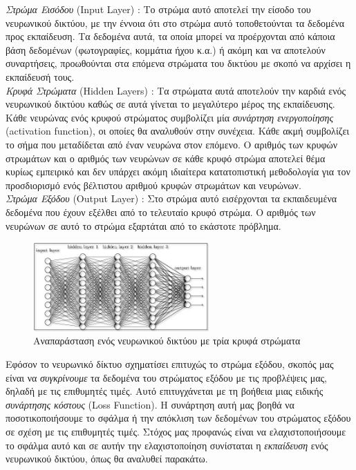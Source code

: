 \documentclass[11pt]{article} %
\numberwithin{equation}{subsection}
\begin{document}
\textit{Στρώμα Εισόδου} (Input Layer) : Το στρώμα αυτό αποτελεί την είσοδο του νευρωνικού δικτύου, με την έννοια ότι στο στρώμα αυτό τοποθετούνται τα δεδομένα προς εκπαίδευση. Τα δεδομένα αυτά, τα οποία μπορεί να προέρχονται από κάποια βάση δεδομένων (φωτογραφίες, κομμάτια ήχου κ.α.) ή ακόμη και να αποτελούν συναρτήσεις, προωθούνται στα επόμενα στρώματα του δικτύου με σκοπό να αρχίσει η εκπαίδευσή τους.\\

\textit{Κρυφά Στρώματα} (Hidden Layers) : Τα στρώματα αυτά αποτελούν την καρδιά ενός νευρωνικού δικτύου καθώς σε αυτά γίνεται το μεγαλύτερο μέρος της εκπαίδευσης. Κάθε νευρώνας ενός κρυφού στρώματος συμβολίζει μία \textit{συνάρτηση ενεργοποίησης} (activation function), οι οποίες θα αναλυθούν στην συνέχεια. Κάθε ακμή συμβολίζει το σήμα που μεταδίδεται από έναν νευρώνα στον επόμενο. Ο αριθμός των κρυφών στρωμάτων και ο αριθμός των νευρώνων σε κάθε κρυφό στρώμα αποτελεί θέμα κυρίως εμπειρικό και δεν υπάρχει ακόμη ιδιαίτερα κατατοπιστική μεθοδολογία για τον προσδιορισμό ενός βέλτιστου αριθμού κρυφών στρωμάτων και νευρώνων.\\

\textit{Στρώμα Εξόδου} (Output Layer) : Στο στρώμα αυτό εισέρχονται τα εκπαιδευμένα δεδομένα που έχουν εξέλθει από το τελευταίο κρυφό στρώμα. Ο αριθμός των νευρώνων σε αυτό το στρώμα εξαρτάται από το εκάστοτε πρόβλημα.\\

\begin{figure}[h]
    \centering
    \includegraphics[width=0.6\textwidth]{NN}
    \caption{Αναπαράσταση ενός νευρωνικού δικτύου με τρία κρυφά στρώματα}
    \label{fig:Neural Net}
\end{figure}


Εφόσον το νευρωνικό δίκτυο σχηματίσει επιτυχώς το στρώμα εξόδου, σκοπός μας είναι να \textit{συγκρίνουμε} τα δεδομένα του στρώματος εξόδου με τις προβλέψεις μας, δηλαδή με τις επιθυμητές τιμές. Αυτό επιτυγχάνεται με τη βοήθεια μιας ειδικής \textit{συνάρτησης κόστους} (Loss Function). Η συνάρτηση αυτή μας βοηθά να ποσοτικοποιήσουμε το σφάλμα ή την απόκλιση των δεδομένων του στρώματος εξόδου σε σχέση με τις επιθυμητές τιμές. Στόχος μας προφανώς είναι να ελαχιστοποιήσουμε το σφάλμα αυτό και σε αυτήν την ελαχιστοποίηση συνίσταται η \textit{εκπαίδευση} ενός νευρωνικού δικτύου, όπως θα αναλυθεί παρακάτω.
\end{document}
